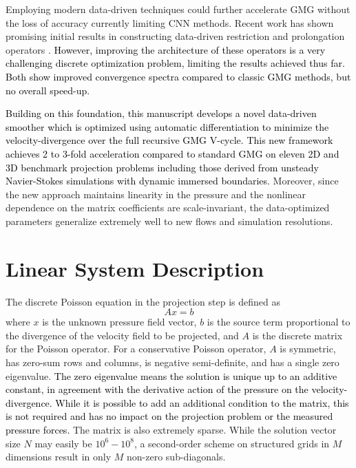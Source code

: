 \documentclass[]{elsarticle}
\begin{document}
Employing modern data-driven techniques could  further accelerate GMG without the loss of accuracy currently limiting CNN methods.  Recent work has shown promising initial results in constructing data-driven restriction and prolongation operators \cite{KATRUTSA2020112524,greenfeld2019learning}. \textcolor{black}{However, improving the architecture of these operators is a very challenging discrete optimization problem, limiting the results achieved thus far. Both \cite{KATRUTSA2020112524,greenfeld2019learning} show improved convergence spectra compared to classic GMG methods, but no overall speed-up. }

\textcolor{black}{Building on this foundation, this manuscript develops a novel data-driven smoother which is optimized using automatic differentiation to minimize the velocity-divergence over the full recursive GMG V-cycle. This new framework achieves 2 to 3-fold acceleration compared to standard GMG on eleven 2D and 3D benchmark projection problems including those derived from unsteady Navier-Stokes simulations with dynamic immersed boundaries.} Moreover, since the new approach maintains linearity in the pressure and the nonlinear dependence on the matrix coefficients are scale-invariant, the data-optimized parameters generalize extremely well to new flows and simulation resolutions.

\section{Linear System Description}

The discrete Poisson equation in the projection step is defined as
\begin{equation}\label{eq:axb}
    A x = b
\end{equation}
where $x$ is the unknown pressure field vector, $b$ is the source term proportional to the divergence of the velocity field to be projected, and $A$ is the discrete matrix for the Poisson operator. For a conservative Poisson operator, $A$ is symmetric, has zero-sum rows and columns, is negative semi-definite, and has a single zero eigenvalue. \textcolor{black}{The zero eigenvalue means the solution is unique up to an additive constant, in agreement with the derivative action of the pressure on the velocity-divergence. While it is possible to add an additional condition to the matrix, this is not required and has no impact on the projection problem or the measured pressure forces.} The matrix is also extremely sparse. While the solution vector size $N$ may easily be $10^6-10^8$, a second-order scheme on structured grids in $M$ dimensions result in only $M$ non-zero sub-diagonals.
\end{document}
